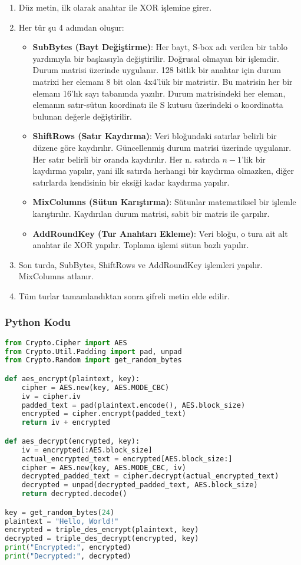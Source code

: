 \begin{enumerate}
    \item Düz metin, ilk olarak anahtar ile XOR işlemine girer.
    \item Her tür şu 4 adımdan oluşur:
    \begin{itemize}
        \item \textbf{SubBytes (Bayt Değiştirme)}: Her bayt, S-box adı verilen bir tablo yardımıyla bir başkasıyla değiştirilir. Doğrusal olmayan bir işlemdir. Durum matrisi üzerinde uygulanır. 128 bitlik bir anahtar için durum matrixi her elemanı 8 bit olan 4x4'lük bir matristir. Bu matrisin her bir elemanı 16'lık sayı tabanında yazılır. Durum matrisindeki her eleman, elemanın satır-sütun koordinatı ile S kutusu üzerindeki o koordinatta bulunan değerle değiştirilir.
        \item \textbf{ShiftRows (Satır Kaydırma)}: Veri bloğundaki satırlar belirli bir düzene göre kaydırılır. Güncellenmiş durum matrisi üzerinde uygulanır. Her satır belirli bir oranda kaydırılır. Her n. satırda $n - 1$'lik bir kaydırma yapılır, yani ilk satırda herhangi bir kaydırma olmazken, diğer satırlarda kendisinin bir eksiği kadar kaydırma yapılır.
        \item \textbf{MixColumns (Sütun Karıştırma)}: Sütunlar matematiksel bir işlemle karıştırılır. Kaydırılan durum matrisi, sabit bir matris ile çarpılır.
        \item \textbf{AddRoundKey (Tur Anahtarı Ekleme)}: Veri bloğu, o tura ait alt anahtar ile XOR yapılır. Toplama işlemi sütun bazlı yapılır.
    \end{itemize}
    \item Son turda, SubBytes, ShiftRows ve AddRoundKey işlemleri yapılır. MixColumns atlanır.
    \item Tüm turlar tamamlandıktan sonra şifreli metin elde edilir.
\end{enumerate}

\subsubsection{Python Kodu}

\begin{lstlisting}[language=Python]
from Crypto.Cipher import AES
from Crypto.Util.Padding import pad, unpad
from Crypto.Random import get_random_bytes

def aes_encrypt(plaintext, key):
    cipher = AES.new(key, AES.MODE_CBC)
    iv = cipher.iv
    padded_text = pad(plaintext.encode(), AES.block_size)
    encrypted = cipher.encrypt(padded_text)
    return iv + encrypted

def aes_decrypt(encrypted, key):
    iv = encrypted[:AES.block_size]
    actual_encrypted_text = encrypted[AES.block_size:]
    cipher = AES.new(key, AES.MODE_CBC, iv)
    decrypted_padded_text = cipher.decrypt(actual_encrypted_text)
    decrypted = unpad(decrypted_padded_text, AES.block_size)
    return decrypted.decode()

key = get_random_bytes(24)
plaintext = "Hello, World!"
encrypted = triple_des_encrypt(plaintext, key)
decrypted = triple_des_decrypt(encrypted, key)
print("Encrypted:", encrypted)
print("Decrypted:", decrypted)
\end{lstlisting}

